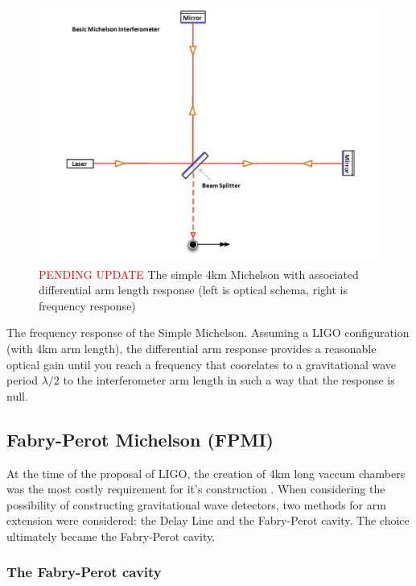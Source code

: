 \begin{figure}[H]
  \begin{center}
    \includegraphics[width=\textwidth]{figs/INTRO/tempsub_Basic_michelson_labeled.jpg}
  \end{center}
  \caption{\textcolor{red}{PENDING UPDATE} The simple 4km Michelson with associated differential arm length response (left is optical schema, right is frequency response)}
  \label{fig:simple_michelson}
\end{figure}

The frequency response of the Simple Michelson. Assuming a LIGO configuration (with 4km arm length), the differential arm response provides a reasonable optical gain until you reach a frequency that coorelates to a gravitational wave period $\lambda / 2$ to the interferometer arm length in such a way that the response is null.

\subsection{Fabry-Perot Michelson (FPMI)}
At the time of the proposal of LIGO, the creation of 4km long vaccum chambers was the most costly requirement for it's construction \cite{?}. When considering the possibility of constructing gravitational wave detectors, two methods for arm extension were considered: the Delay Line and the Fabry-Perot cavity. The choice ultimately became the Fabry-Perot cavity.

\subsubsection{The Fabry-Perot cavity}

